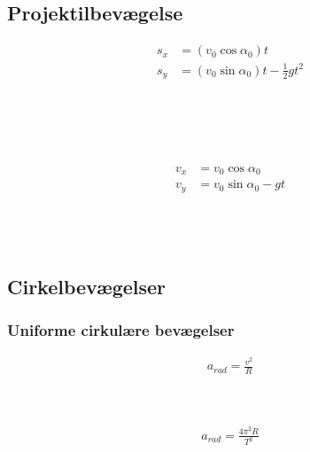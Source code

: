 \subsection{Projektilbevægelse}
	\begin{align}
		s_x&=(v_0\cos\alpha_0)t\\
		s_y&=(v_0\sin\alpha_0)t-\frac{1}{2}gt^2
	\end{align}
	\strek\\
	\velbeg\\
	\angbeg\\
	\tyngde\\
	\tid

	\begin{align}
		v_x&=v_0\cos\alpha_0\\
		v_y&=v_0\sin\alpha_0-gt
	\end{align}
	\vel\\
	\velbeg\\
	\angbeg\\
	\tyngde

\subsection{Cirkelbevægelser}
	\subsubsection{Uniforme cirkulære bevægelser}
		\begin{align}
			a_{rad}=\frac{v^2}{R}
		\end{align}
		\acc\\
		\vel\\
		\radcircvej
		
		\begin{align}
			a_{rad}=\frac{4\pi^2R}{T^2}
		\end{align}
		\acc\\
		\radcircvej\\
		\periode
	